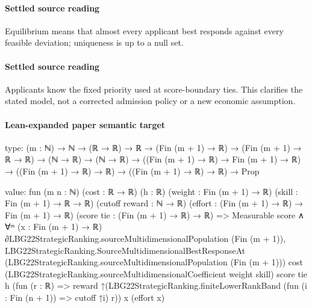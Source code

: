 \documentclass[10pt]{article}
\begin{document}
\begin{ReviewVerbatim}
\begin{definition} [Equilibrium]
{{	}
	}
\end{definition}
\end{ReviewVerbatim}

\paragraph{Settled source reading}
\begin{sloppypar}
Equilibrium means that almost every applicant best responds against every feasible deviation;\allowbreak{} uniqueness is up to a null set.\allowbreak{}
\end{sloppypar}
\paragraph{Settled source reading}
\begin{sloppypar}
Applicants know the fixed priority used at score-\allowbreak{}boundary ties.\allowbreak{} This clarifies the stated model, not a corrected admission policy or a new economic assumption.\allowbreak{}
\end{sloppypar}

\paragraph{Lean-expanded paper semantic target}
\begin{ReviewVerbatim}
type:
(m : ℕ) →
  ℕ →
    (ℝ → ℝ) →
      ℝ →
        (Fin (m + 1) → ℝ) →
          (Fin (m + 1) → ℝ → ℝ) →
            (ℕ → ℝ) →
              (ℕ → ℝ) → ((Fin (m + 1) → ℝ) → Fin (m + 1) → ℝ) → ((Fin (m + 1) → ℝ) → ℝ) → ((Fin (m + 1) → ℝ) → ℝ) → Prop

value:
fun (m n : ℕ) (cost : ℝ → ℝ) (h : ℝ) (weight : Fin (m + 1) → ℝ) (skill : Fin (m + 1) → ℝ → ℝ) (cutoff reward : ℕ → ℝ)
    (effort : (Fin (m + 1) → ℝ) → Fin (m + 1) → ℝ) (score tie : (Fin (m + 1) → ℝ) → ℝ) =>
  Measurable score ∧
    ∀ᵐ (x : Fin (m + 1) → ℝ) ∂LBG22StrategicRanking.sourceMultidimensionalPopulation (Fin (m + 1)),
      LBG22StrategicRanking.SourceMultidimensionalBestResponseAt
        (LBG22StrategicRanking.sourceMultidimensionalPopulation (Fin (m + 1))) cost
        (LBG22StrategicRanking.sourceMultidimensionalCoefficient weight skill) score tie h
        (fun (r : ℝ) => reward ↑(LBG22StrategicRanking.finiteLowerRankBand (fun (i : Fin (n + 1)) => cutoff ↑i) r)) x
        (effort x)
\end{ReviewVerbatim}
\end{document}

